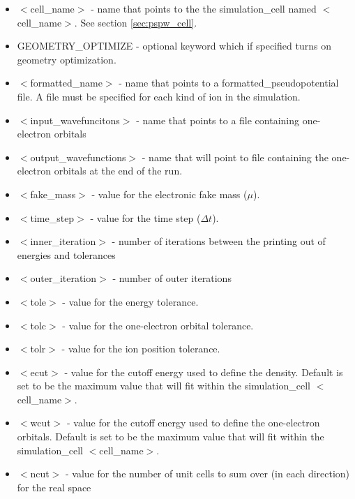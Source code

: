 \begin{itemize}
        \item $<$cell\_name$>$ - name that points to the
              the simulation\_cell named $<$cell\_name$>$. See section \ref{sec:pspw_cell}.
        \item GEOMETRY\_OPTIMIZE - optional keyword which if specified
              turns on geometry optimization.   
        \item $<$formatted\_name$>$ - name that points
              to a formatted\_pseudopotential file.  A file must
              be specified for each kind of ion in the simulation.
        \item $<$input\_wavefuncitons$>$ - name that points
              to a file containing one-electron orbitals
        \item $<$output\_wavefunctions$>$ - name that will
              point to file containing the one-electron orbitals at the
              end of the run. 
        \item $<$fake\_mass$>$ - value for the electronic
              fake mass ($\mu$).
        \item $<$time\_step$>$ - value for the time step ($\Delta t$).
        \item $<$inner\_iteration$>$ - number of iterations between the 
              printing out of energies and tolerances
        \item $<$outer\_iteration$>$ - number of outer iterations
        \item $<$tole$>$ - value for the energy tolerance.
        \item $<$tolc$>$ - value for the one-electron orbital tolerance.
        \item $<$tolr$>$ - value for the ion position tolerance.
        \item $<$ecut$>$ - value for the cutoff energy used
                           to define the density.  Default is set
                           to be the maximum value that will fit
                           within the simulation\_cell $<$cell\_name$>$.
        \item $<$wcut$>$ - value for the cutoff energy used
                           to define the one-electron orbitals. Default is set
                           to be the maximum value that will fit
                           within the simulation\_cell $<$cell\_name$>$.
        \item $<$ncut$>$ - value for the number of unit cells
                          to sum over (in each direction) for the real space

\end{itemize}
